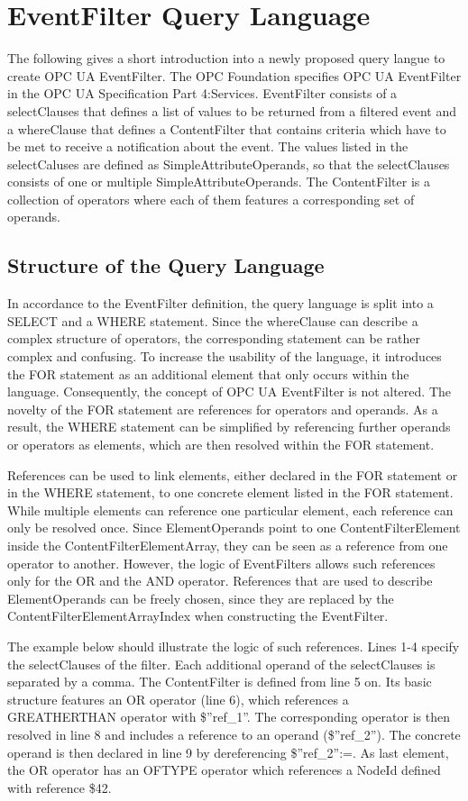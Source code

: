 \documentclass[10pt]{scrreprt}
\begin{document}
\chapter{EventFilter Query Language}
The following gives a short introduction into a newly proposed query langue to create OPC UA EventFilter.
The OPC Foundation specifies OPC UA EventFilter in the OPC UA Specification Part 4:Services. EventFilter consists of
a selectClauses that defines a list of values to be returned from a filtered event and a whereClause that defines a
ContentFilter that contains criteria which have to be met to receive a notification about the event. The values listed in the
selectCaluses are defined as SimpleAttributeOperands, so that the selectClauses consists of one or multiple
SimpleAttributeOperands. The ContentFilter is a collection of operators where each of them features a corresponding set of operands.

\section{Structure of the Query Language}
In accordance to the EventFilter definition, the query language is split into a SELECT and a WHERE statement.
Since the whereClause can describe a complex structure of operators, the corresponding statement can be rather complex and confusing.
To increase the usability of the language,
it introduces the FOR statement as an additional element that only occurs within the language. Consequently,
the concept of OPC UA EventFilter is not altered. The novelty of the FOR statement are references for operators and
operands. As a result, the WHERE statement can be simplified by referencing further operands or operators as elements,
which are then resolved within the FOR statement.

References can be used to link elements, either declared in the FOR statement or in the WHERE statement, to one
concrete element listed in the FOR statement. While multiple elements can reference one particular element, each reference
can only be resolved once. Since ElementOperands point to one ContentFilterElement inside the ContentFilterElementArray,
they can be seen as a reference from one operator to another. However, the logic of EventFilters
allows such references only for the OR and the AND operator. References that are used to describe ElementOperands can be freely chosen,
since they are replaced by the ContentFilterElementArrayIndex when constructing the EventFilter.


The example below should illustrate the logic of such references. Lines 1-4 specify
the selectClauses of the filter. Each additional operand of the selectClauses is separated by a comma. The ContentFilter
is defined from line 5 on. Its basic structure features an OR operator (line 6), which references a
GREATHERTHAN operator with \$”ref\_1”. The corresponding operator is then resolved in line 8 and
includes a reference to an operand (\$”ref\_2”). The concrete operand is then
declared in line 9 by dereferencing \$”ref\_2”:=. As last element, the OR operator has an OFTYPE operator which
references a NodeId defined with reference \$42.
\end{document}
